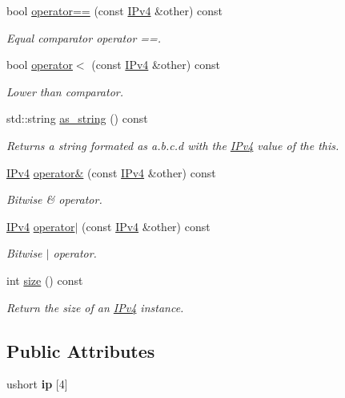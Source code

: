 \begin{DoxyCompactItemize}
bool \hyperlink{structIPv4_ae48386c1a1459ba91d3303139f93a345}{operator==} (const \hyperlink{structIPv4}{I\+Pv4} \&other) const 
\begin{DoxyCompactList}\small\item\em Equal comparator operator ==. \end{DoxyCompactList}\item 
bool \hyperlink{structIPv4_aca07a74ffaa34d0593425ea5523a31e7}{operator$<$} (const \hyperlink{structIPv4}{I\+Pv4} \&other) const 
\begin{DoxyCompactList}\small\item\em Lower than comparator. \end{DoxyCompactList}\item 
std\+::string \hyperlink{structIPv4_acb7ed5ccf7af572bbc32396dcd1fe3cb}{as\+\_\+string} () const 
\begin{DoxyCompactList}\small\item\em Returns a string formated as \textquotesingle{}a.\+b.\+c.\+d\textquotesingle{} with the \hyperlink{structIPv4}{I\+Pv4} value of the this. \end{DoxyCompactList}\item 
\hyperlink{structIPv4}{I\+Pv4} \hyperlink{structIPv4_a63975afd93012938a25911e670396cbe}{operator\&} (const \hyperlink{structIPv4}{I\+Pv4} \&other) const 
\begin{DoxyCompactList}\small\item\em Bitwise \& operator. \end{DoxyCompactList}\item 
\hyperlink{structIPv4}{I\+Pv4} \hyperlink{structIPv4_af7e0b46fd7a4515d5a0a61f93517774d}{operator$\vert$} (const \hyperlink{structIPv4}{I\+Pv4} \&other) const 
\begin{DoxyCompactList}\small\item\em Bitwise $\vert$ operator. \end{DoxyCompactList}\item 
int \hyperlink{structIPv4_a607922ab456f0f29a8b1ca5c48e3ed38}{size} () const 
\begin{DoxyCompactList}\small\item\em Return the size of an \hyperlink{structIPv4}{I\+Pv4} instance. \end{DoxyCompactList}\end{DoxyCompactItemize}
\subsection*{Public Attributes}
\begin{DoxyCompactItemize}
\item 
ushort {\bfseries ip} \mbox{[}4\mbox{]}\hypertarget{structIPv4_afa52210d2b97527f5e64cc307860983f}{}\label{structIPv4_afa52210d2b97527f5e64cc307860983f}

\end{DoxyCompactItemize}
